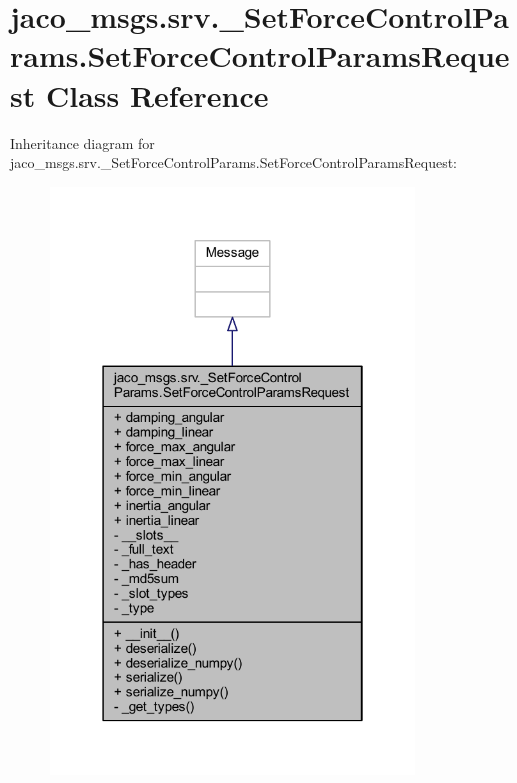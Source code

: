 \hypertarget{classjaco__msgs_1_1srv_1_1__SetForceControlParams_1_1SetForceControlParamsRequest}{}\section{jaco\+\_\+msgs.\+srv.\+\_\+\+Set\+Force\+Control\+Params.\+Set\+Force\+Control\+Params\+Request Class Reference}
\label{classjaco__msgs_1_1srv_1_1__SetForceControlParams_1_1SetForceControlParamsRequest}


Inheritance diagram for jaco\+\_\+msgs.\+srv.\+\_\+\+Set\+Force\+Control\+Params.\+Set\+Force\+Control\+Params\+Request\+:
\nopagebreak
\begin{figure}[H]
\begin{center}
\leavevmode
\includegraphics[width=274pt]{de/d7d/classjaco__msgs_1_1srv_1_1__SetForceControlParams_1_1SetForceControlParamsRequest__inherit__graph}
\end{center}
\end{figure}


